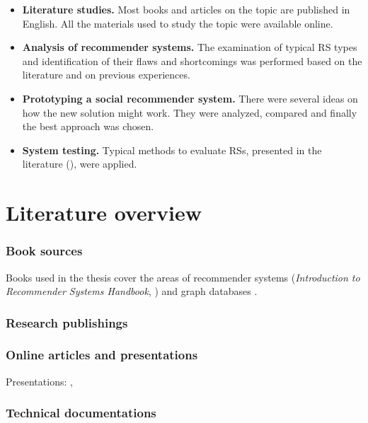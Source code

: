 \documentclass[12pt]{report}
\begin{document}
\begin{itemize}
\item {\bf Literature studies.} Most books and articles on the topic are published in English. All the materials used to study the topic were available online. 
\item {\bf Analysis of recommender systems.} The examination of typical RS types and identification of their flaws and shortcomings was performed based on the literature and on previous experiences.
\item {\bf Prototyping a social recommender system.} There were several ideas on how the new solution might work. They were analyzed, compared and finally the best approach was chosen.
\item {\bf System testing.} Typical methods to evaluate RSs, presented in the literature (\cite{eval_microsoft, eval_twente}), were applied. 
\end{itemize}

\section{Literature overview} %

\subsubsection{Book sources}
Books used in the thesis cover the areas of recommender systems (\textit{Introduction to Recommender Systems Handbook}, \cite{rec_sys_handbook}) and graph databases \cite{graph_databases, learning_neo4j}.

\subsubsection{Research publishings}





\subsubsection{Online articles and presentations}
Presentations: \cite{rise_of_social_commerce}, \cite{}


\subsubsection{Technical documentations}
\end{document}
